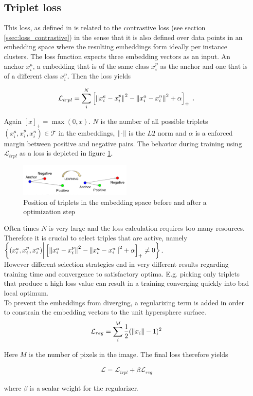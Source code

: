 \subsection{Triplet loss}\label{ssec:loss_triplet}
This loss, as defined in \cite{Schroff_2015} is related to the contrastive loss (see section \ref{ssec:loss_contrastive}) in the sense that it is also defined over data points in an embedding space where the resulting embeddings form ideally per instance clusters. The loss function expects three embedding vectors as an input. An anchor $x_i^a$, a embedding that is of the same class $x_i^p$ as the anchor and one that is of a different class $x_i^n$. Then the loss yields

\begin{align}
	\mathcal{L}_{trpl} = \sum_i^N \left[ \left\lVert x_i^a - x_i^p\right\rVert^2 - \left\lVert x_i^a - x_i^n\right\rVert^2 + \alpha \right]_+ \text{\hspace{1mm}.}
\end{align} 

Again $[x]_+ = \max(0, x)$. $N$ is the number of all possible triplets $(x_i^a, x_i^p, x_i^n) \in \mathcal{T}$ in the embeddings, $\left\lVert\cdot\right\rVert$ is the $L2$ norm and $\alpha$ is a enforced margin between positive and negative pairs. The behavior during training using $\mathcal{L}_{trpl}$ as a loss is depicted in figure \ref{fig_triplet}. \\

\begin{figure}[ht!]
	\centering
	\includegraphics[width=0.5\textwidth]{figures/triplet_loss.png}
	\caption{\cite{Schroff_2015} Position of triplets in the embedding space before and after a optimization step}
	\label{fig_triplet}
\end{figure}

Often times $N$ is very large and the loss calculation requires too many resources. Therefore it is crucial to select triples that are active, namely $\left\{ (x_i^a, x_i^p, x_i^n) \bigg| \left[ \left\lVert x_i^a - x_i^p\right\rVert^2 - \left\lVert x_i^a - x_i^n\right\rVert^2 + \alpha \right]_+ \neq 0 \right\}$.\\  However different selection strategies end in very different results regarding training time and convergence to satisfactory optima. E.g. picking only triplets that produce a high loss value can result in a training converging quickly into bad local optimum.\\
To prevent the embeddings from diverging, a regularizing term is added in order to constrain the embedding vectors to the unit hypersphere surface.
\begin{align}
	\mathcal{L}_{reg} = \sum_i^M\frac{1}{2}(\left\lVert x_i\right\rVert - 1)^2
\end{align}

Here $M$ is the number of pixels in the image. The final loss therefore yields

\begin{align}
\mathcal{L} = \mathcal{L}_{trpl} + \beta \mathcal{L}_{reg}
\end{align}

where $\beta$ is a scalar weight for the regularizer.